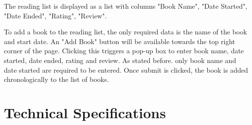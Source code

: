 \documentclass{article}
\begin{document}
The reading list is displayed as a list with columns "Book Name", "Date Started", 
"Date Ended", "Rating", "Review".

To add a book to the reading list, the only required data is the name of the book 
and start date. 
An "Add Book" button will be available towards the top right corner of the page. 
Clicking this triggers a pop-up box to enter book name, date started, date ended, 
rating and review. As stated before. only book name and date started are required 
to be entered. Once submit is clicked, the book is added chronologically to the 
list of books.

\section*{Technical Specifications}
\end{document}
